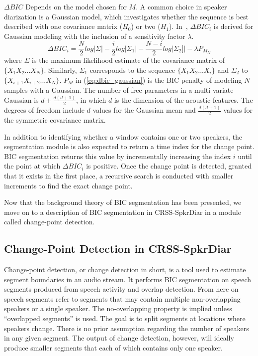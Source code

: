 $\Delta BIC$ Depends on the model chosen for $M$. 
A common choice in speaker diarization is a Gaussian model, which investigates whether the sequence is best described with one covariance matrix ($H_0$) or two ($H_1$). 
In~\cite{cettolo2005evaluation}, $\Delta BIC_i$ is derived for Gaussian modeling with the inclusion of a sensitivity factor $\lambda$. 
\begin{equation}
\label{eq:dbic_gaussian}
\Delta BIC_i = \frac{N}{2} log |\Sigma| - \frac{i}{2} log |\Sigma_1| - \frac{N-i}{2}log |\Sigma_2]| - \lambda P_{M_N}
\end{equation}
where $\Sigma$ is the maximum likelihood estimate of the covariance matrix of $\{X_1X_2...X_N\}$. Similarly, $\Sigma_1$ corresponds to the sequence $\{X_1X_2...X_i\}$ and $\Sigma_2$ to $\{X_{i+1}X_{i+2}...X_N\}$. 
$P_M$ in (\ref{eq:dbic_gaussian}) is the BIC penalty of modeling $N$ samples with a Gaussian. 
The number of free parameters in a multi-variate Gaussian is $d + \frac{d(d+1)}{2}$, in which $d$ is the dimension of the acoustic features. 
The degrees of freedom include $d$ values for the Gaussian mean and $\frac{d(d+1)}{2}$ values for the symmetric covariance matrix. 

In addition to identifying whether a window contains one or two speakers, the segmentation module is also expected to return a time index for the change point. 
BIC segmentation returns this value by incrementally increasing the index $i$ until the point at which $\Delta BIC_i$ is positive. 
Once the change point is detected, granted that it exists in the first place, a recursive search is conducted with smaller increments to find the exact change point. 

Now that the background theory of BIC segmentation has been presented, we move on to a description of BIC segmentation in CRSS-SpkrDiar in a module called change-point detection. 

\subsection{Change-Point Detection in CRSS-SpkrDiar}
Change-point detection, or change detection in short, is a tool used to estimate segment boundaries in an audio stream. 
It performs BIC segmentation on speech segments produced from speech activity and overlap detection. 
From here on speech segments refer to segments that may contain multiple non-overlapping speakers or a single speaker. 
The no-overlapping property is implied unless ``overlapped segments'' is used. 
The goal is to split segments at locations where speakers change. 
There is no prior assumption regarding the number of speakers in any given segment. 
The output of change detection, however, will ideally produce smaller segments that each of which contains only one speaker. 

